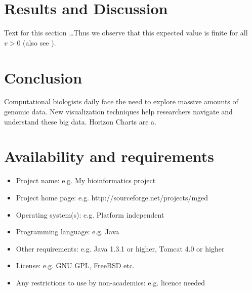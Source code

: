 \documentclass{bmcart}
\begin{document}
\section*{Results and Discussion}

Text for this section \ldots Thus we observe that this expected value is finite
for all $v>0$ (also see \cite{koon,khar,zvai,xjon,marg}).

\section*{Conclusion}
Computational biologists daily face the need to explore massive amounts of
genomic data.  New visualization techniques help researchers navigate and
understand these big data. Horizon Charts are a.

\section*{Availability and requirements}


\begin{itemize}
  \item Project name: e.g. My bioinformatics project
  \item Project home page: e.g. http://sourceforge.net/projects/mged
  \item Operating system(s): e.g. Platform independent
  \item Programming language: e.g. Java
  \item Other requirements: e.g. Java 1.3.1 or higher, Tomcat 4.0 or higher
  \item License: e.g. GNU GPL, FreeBSD etc.
  \item Any restrictions to use by non-academics: e.g. licence needed
\end{itemize}





\end{document}
